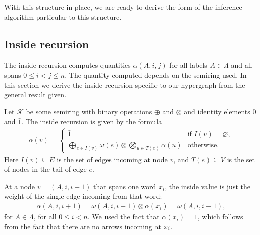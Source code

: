  With this structure in place, we are ready to derive the form of the inference algorithm particular to this structure.

\subsection{Inside recursion}
  The inside recursion computes quantities $\alpha(A,i,j)$ for all labels $A \in \Lambda$ and all spans $0 \leq i < j \leq n$. The quantity computed depends on the semiring used. In this section we derive the inside recursion specific to our hypergraph from the general result given.

  Let $\mathcal{K}$ be some semiring with binary operations $\oplus$ and $\otimes$ and identity elements $\bar{0}$ and $\bar{1}$. The inside recursion is given by the formula \citep{goodman1999semiring}
  \begin{align*}
    \alpha(v) =
      \begin{cases}
        \bar{1}  &  \mbox{if } I(v) = \varnothing,  \\
        \displaystyle\bigoplus_{e \in I(v)} \omega(e) \otimes \displaystyle\bigotimes_{u \in T(e)} \alpha(u)  & \mbox{otherwise.}
      \end{cases}
  \end{align*}
  Here $I(v) \subseteq E$ is the set of edges incoming at node $v$, and $T(e) \subseteq V$ is the set of nodes in the tail of edge $e$.

  At a node $v = (A, i, i+1)$ that spans one word $x_i$, the inside value is just the weight of the single edge incoming from that word:
  \begin{align}
      \label{eq:inside-base}
      \alpha(A, i, i+1) = \omega(A, i, i+1) \otimes \alpha(x_i) = \omega(A, i, i+1),
  \end{align}
  for $A \in \Lambda$, for all $0 \leq i < n$. We used the fact that $\alpha(x_i) = \bar{1}$, which follows from the fact that there are no arrows incoming at $x_i$.

